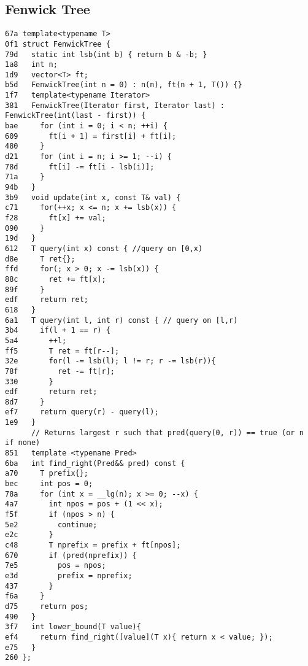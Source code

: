 \documentclass[10pt, a4paper, twoside]{article}
\begin{document}
\subsection{Fenwick Tree}
\begin{lstlisting}
67a template<typename T>
0f1 struct FenwickTree {
79d   static int lsb(int b) { return b & -b; }
1a8   int n;
1d9   vector<T> ft;
b5d   FenwickTree(int n = 0) : n(n), ft(n + 1, T()) {}
1f7   template<typename Iterator>
381   FenwickTree(Iterator first, Iterator last) : FenwickTree(int(last - first)) {
bae     for (int i = 0; i < n; ++i) {
609       ft[i + 1] = first[i] + ft[i];
480     }
d21     for (int i = n; i >= 1; --i) {
78d       ft[i] -= ft[i - lsb(i)];
71a     }
94b   }
3b9   void update(int x, const T& val) {
c71     for(++x; x <= n; x += lsb(x)) {
f28       ft[x] += val; 
090     }
19d   }
612   T query(int x) const { //query on [0,x)
d8e     T ret{};
ffd     for(; x > 0; x -= lsb(x)) {
88c       ret += ft[x];
89f     }
edf     return ret;
618   }
6a1   T query(int l, int r) const { // query on [l,r)
3b4     if(l + 1 == r) {
5a4       ++l;
ff5       T ret = ft[r--];
32e       for(l -= lsb(l); l != r; r -= lsb(r)){
78f         ret -= ft[r];
330       }
edf       return ret;
8d7     }
ef7     return query(r) - query(l);
1e9   }
      // Returns largest r such that pred(query(0, r)) == true (or n if none)
851   template <typename Pred>
6ba   int find_right(Pred&& pred) const {
a70     T prefix{};
bec     int pos = 0;
78a     for (int x = __lg(n); x >= 0; --x) {
4a7       int npos = pos + (1 << x);
f5f       if (npos > n) {
5e2         continue;
e2c       }
c48       T nprefix = prefix + ft[npos];
670       if (pred(nprefix)) {
7e5         pos = npos;
e3d         prefix = nprefix;
437       }
f6a     }
d75     return pos;
490   }
3f7   int lower_bound(T value){ 
ef4     return find_right([value](T x){ return x < value; });
e75   }
260 };
\end{lstlisting}
\end{document}

